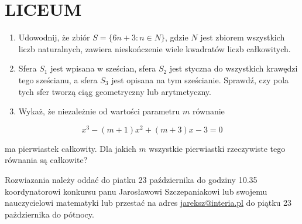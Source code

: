 \documentclass[10pt]{article}
\begin{document}
\section*{LICEUM}
\begin{enumerate}
  \item Udowodnij, że zbiór \(S=\{6 n+3: n \in N\}\), gdzie \(N\) jest zbiorem wszystkich liczb naturalnych, zawiera nieskończenie wiele kwadratów liczb całkowitych.
  \item Sfera \(S_{1}\) jest wpisana w sześcian, sfera \(S_{2}\) jest styczna do wszystkich krawędzi tego sześcianu, a sfera \(S_{3}\) jest opisana na tym sześcianie. Sprawdź, czy pola tych sfer tworzą ciąg geometryczny lub arytmetyczny.
  \item Wykaż, że niezależnie od wartości parametru \(m\) równanie
\end{enumerate}

\[
x^{3}-(m+1) x^{2}+(m+3) x-3=0
\]

ma pierwiastek całkowity. Dla jakich \(m\) wszystkie pierwiastki rzeczywiste tego równania są całkowite?

Rozwiazania należy oddać do piatku 23 października do godziny 10.35 koordynatorowi konkursu panu Jarosławowi Szczepaniakowi lub swojemu nauczycielowi matematyki lub przestać na adres \href{mailto:jareksz@interia.pl}{jareksz@interia.pl} do piątku 23 pażdziernika do pótnocy.
\end{document}
